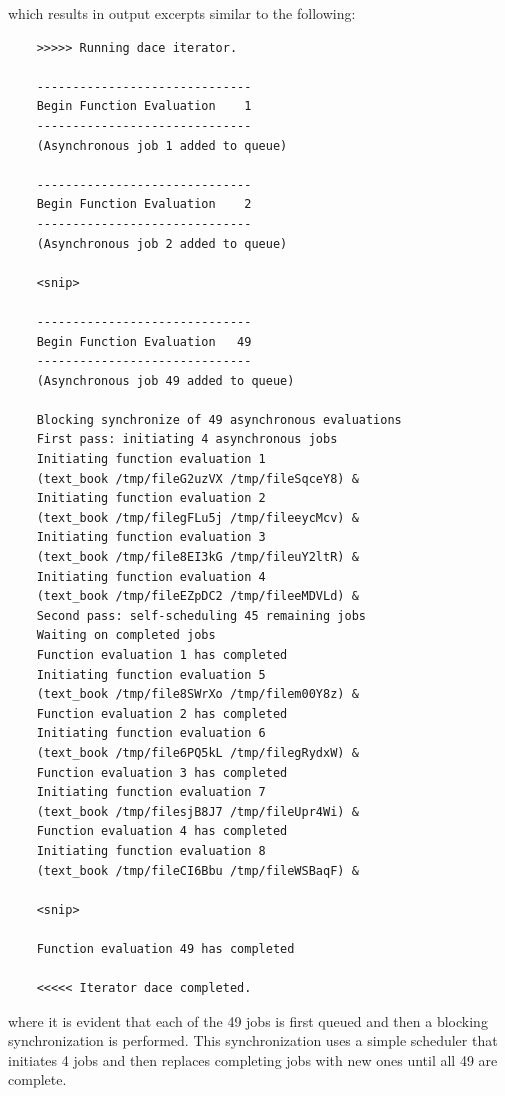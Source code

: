 which results in output excerpts similar to the following:
\begin{small}
\begin{verbatim}
    >>>>> Running dace iterator.

    ------------------------------
    Begin Function Evaluation    1
    ------------------------------
    (Asynchronous job 1 added to queue)

    ------------------------------
    Begin Function Evaluation    2
    ------------------------------
    (Asynchronous job 2 added to queue)

    <snip>

    ------------------------------
    Begin Function Evaluation   49
    ------------------------------
    (Asynchronous job 49 added to queue)

    Blocking synchronize of 49 asynchronous evaluations
    First pass: initiating 4 asynchronous jobs
    Initiating function evaluation 1
    (text_book /tmp/fileG2uzVX /tmp/fileSqceY8) &
    Initiating function evaluation 2
    (text_book /tmp/filegFLu5j /tmp/fileeycMcv) &
    Initiating function evaluation 3
    (text_book /tmp/file8EI3kG /tmp/fileuY2ltR) &
    Initiating function evaluation 4
    (text_book /tmp/fileEZpDC2 /tmp/fileeMDVLd) &
    Second pass: self-scheduling 45 remaining jobs
    Waiting on completed jobs
    Function evaluation 1 has completed
    Initiating function evaluation 5
    (text_book /tmp/file8SWrXo /tmp/filem00Y8z) &
    Function evaluation 2 has completed
    Initiating function evaluation 6
    (text_book /tmp/file6PQ5kL /tmp/filegRydxW) &
    Function evaluation 3 has completed
    Initiating function evaluation 7
    (text_book /tmp/filesjB8J7 /tmp/fileUpr4Wi) &
    Function evaluation 4 has completed
    Initiating function evaluation 8
    (text_book /tmp/fileCI6Bbu /tmp/fileWSBaqF) &

    <snip>

    Function evaluation 49 has completed

    <<<<< Iterator dace completed.
\end{verbatim}
\end{small}
where it is evident that each of the 49 jobs is first queued and then
a blocking synchronization is performed.  This synchronization uses a
simple scheduler that initiates 4 jobs and then replaces completing
jobs with new ones until all 49 are complete.

